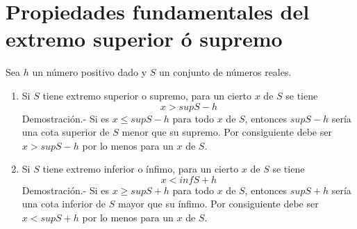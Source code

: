 \section*{Propiedades fundamentales del extremo superior ó supremo}
\begin{teo}
Sea $h$ un número positivo dado y $S$ un conjunto de números reales.
\begin{enumerate}[\bfseries a)]
\item Si $S$ tiene extremo superior o supremo, para un cierto $x$ de $S$ se tiene 
$$x>supS-h$$
Demostración.- \; Si es $x\leq supS -h$ para todo $x$ de $S$, entonces $supS-h$ sería una cota superior de $S$ menor que su supremo. Por consiguiente debe ser $x>supS-h$ por lo menos para un $x$ de $S$.
\item Si $S$ tiene extremo inferior o ínfimo, para un cierto $x$ de $S$ se tiene 
$$x<infS+h$$
Demostración.- \; Si es $x \geq supS+h$ para todo $x$ de $S$, entonces $supS+h$ sería una cota inferior de $S$ mayor que su ínfimo. Por consiguiente debe ser $x<supS+h$ por lo menos para un $x$ de $S$.
\end{enumerate}
\end{teo}

